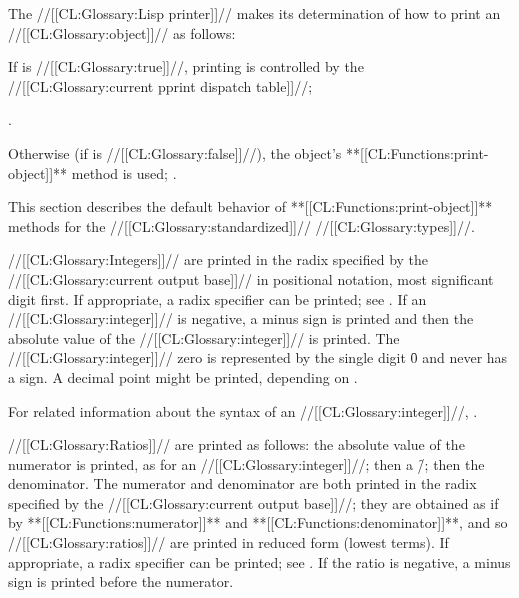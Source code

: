 The //[[CL:Glossary:Lisp printer]]// makes its determination of how to print an
//[[CL:Glossary:object]]// as follows:

If  is //[[CL:Glossary:true]]//, 
printing is controlled by the //[[CL:Glossary:current pprint dispatch table]]//;

\seesection\PPrintDispatchTables.

Otherwise (if  is //[[CL:Glossary:false]]//),
the object's **[[CL:Functions:print-object]]** method is used;
\seesection\DefaultPrintObjMeths.


\endsubsection%





This section describes the default behavior of 
**[[CL:Functions:print-object]]** methods for the //[[CL:Glossary:standardized]]// //[[CL:Glossary:types]]//.




//[[CL:Glossary:Integers]]// are printed in the radix specified by the //[[CL:Glossary:current output base]]//
in positional notation, most significant digit first.
If appropriate, a radix specifier can be printed; see .
If an //[[CL:Glossary:integer]]// is negative, a minus sign is printed and then the
absolute value of the //[[CL:Glossary:integer]]// is printed.
The //[[CL:Glossary:integer]]// zero is represented
by the single digit \f{0} and never has a sign.
A decimal point might be printed, 
depending on .

For related information about the syntax of an //[[CL:Glossary:integer]]//,
\seesection\SyntaxOfIntegers.

\endsubsubsubsection%


//[[CL:Glossary:Ratios]]// are printed as follows:
the absolute value of the numerator is printed, as for an //[[CL:Glossary:integer]]//;
then a \f{/}; then the denominator.  The numerator and denominator are
both printed in the radix specified by the //[[CL:Glossary:current output base]]//; 
they are obtained as if by
**[[CL:Functions:numerator]]** and **[[CL:Functions:denominator]]**, and so //[[CL:Glossary:ratios]]//
are printed in reduced form (lowest terms).
If appropriate, a radix specifier can be printed; see 
.
If the ratio is negative, a minus sign is printed before the numerator.

